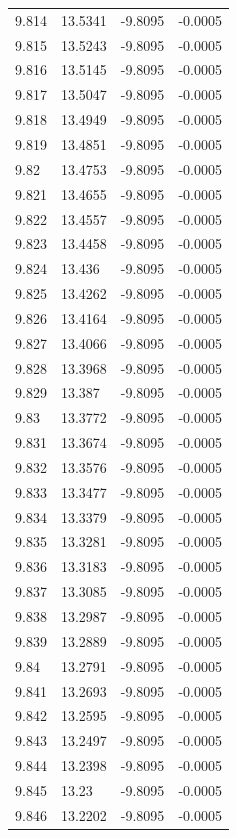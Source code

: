 \begin{tabular}{llll}
9.814 & 13.5341 & -9.8095 & -0.0005 \\
9.815 & 13.5243 & -9.8095 & -0.0005 \\
9.816 & 13.5145 & -9.8095 & -0.0005 \\
9.817 & 13.5047 & -9.8095 & -0.0005 \\
9.818 & 13.4949 & -9.8095 & -0.0005 \\
9.819 & 13.4851 & -9.8095 & -0.0005 \\
9.82 & 13.4753 & -9.8095 & -0.0005 \\
9.821 & 13.4655 & -9.8095 & -0.0005 \\
9.822 & 13.4557 & -9.8095 & -0.0005 \\
9.823 & 13.4458 & -9.8095 & -0.0005 \\
9.824 & 13.436 & -9.8095 & -0.0005 \\
9.825 & 13.4262 & -9.8095 & -0.0005 \\
9.826 & 13.4164 & -9.8095 & -0.0005 \\
9.827 & 13.4066 & -9.8095 & -0.0005 \\
9.828 & 13.3968 & -9.8095 & -0.0005 \\
9.829 & 13.387 & -9.8095 & -0.0005 \\
9.83 & 13.3772 & -9.8095 & -0.0005 \\
9.831 & 13.3674 & -9.8095 & -0.0005 \\
9.832 & 13.3576 & -9.8095 & -0.0005 \\
9.833 & 13.3477 & -9.8095 & -0.0005 \\
9.834 & 13.3379 & -9.8095 & -0.0005 \\
9.835 & 13.3281 & -9.8095 & -0.0005 \\
9.836 & 13.3183 & -9.8095 & -0.0005 \\
9.837 & 13.3085 & -9.8095 & -0.0005 \\
9.838 & 13.2987 & -9.8095 & -0.0005 \\
9.839 & 13.2889 & -9.8095 & -0.0005 \\
9.84 & 13.2791 & -9.8095 & -0.0005 \\
9.841 & 13.2693 & -9.8095 & -0.0005 \\
9.842 & 13.2595 & -9.8095 & -0.0005 \\
9.843 & 13.2497 & -9.8095 & -0.0005 \\
9.844 & 13.2398 & -9.8095 & -0.0005 \\
9.845 & 13.23 & -9.8095 & -0.0005 \\
9.846 & 13.2202 & -9.8095 & -0.0005 \\

\end{tabular}
